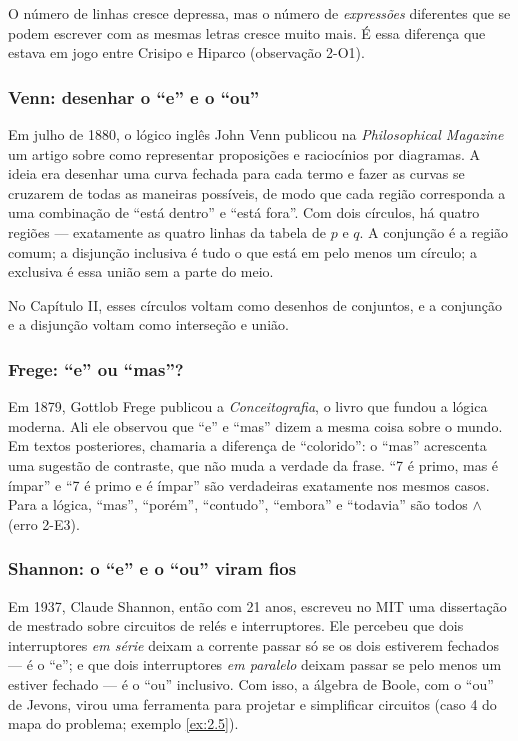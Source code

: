 O número de linhas cresce depressa, mas o número de \emph{expressões} diferentes que se podem escrever com as mesmas letras cresce muito mais. É essa diferença que estava em jogo entre Crisipo e Hiparco (observação 2-O1).

\subsubsection{Venn: desenhar o \enquote{e} e o \enquote{ou}}
Em julho de 1880, o lógico inglês John Venn publicou na \emph{Philosophical Magazine} um artigo sobre como representar proposições e raciocínios por diagramas. A ideia era desenhar uma curva fechada para cada termo e fazer as curvas se cruzarem de todas as maneiras possíveis, de modo que cada região corresponda a uma combinação de \enquote{está dentro} e \enquote{está fora}. Com dois círculos, há quatro regiões — exatamente as quatro linhas da tabela de $p$ e $q$. A conjunção é a região comum; a disjunção inclusiva é tudo o que está em pelo menos um círculo; a exclusiva é essa união sem a parte do meio.

No Capítulo II, esses círculos voltam como desenhos de conjuntos, e a conjunção e a disjunção voltam como interseção e união.

\subsubsection{Frege: \enquote{e} ou \enquote{mas}?}
Em 1879, Gottlob Frege publicou a \emph{Conceitografia}, o livro que fundou a lógica moderna. Ali ele observou que \enquote{e} e \enquote{mas} dizem a mesma coisa sobre o mundo. Em textos posteriores, chamaria a diferença de \enquote{colorido}: o \enquote{mas} acrescenta uma sugestão de contraste, que não muda a verdade da frase. \enquote{7 é primo, mas é ímpar} e \enquote{7 é primo e é ímpar} são verdadeiras exatamente nos mesmos casos. Para a lógica, \enquote{mas}, \enquote{porém}, \enquote{contudo}, \enquote{embora} e \enquote{todavia} são todos $\wedge$ (erro 2-E3).

\subsubsection{Shannon: o \enquote{e} e o \enquote{ou} viram fios}
Em 1937, Claude Shannon, então com 21 anos, escreveu no MIT uma dissertação de mestrado sobre circuitos de relés e interruptores. Ele percebeu que dois interruptores \emph{em série} deixam a corrente passar só se os dois estiverem fechados — é o \enquote{e}; e que dois interruptores \emph{em paralelo} deixam passar se pelo menos um estiver fechado — é o \enquote{ou} inclusivo. Com isso, a álgebra de Boole, com o \enquote{ou} de Jevons, virou uma ferramenta para projetar e simplificar circuitos (caso 4 do mapa do problema; exemplo \ref{ex:2.5}).

